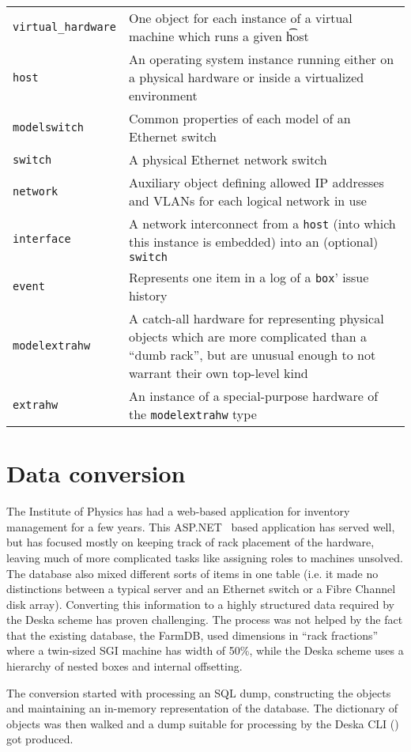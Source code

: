 \documentclass[deska]{subfiles}
\begin{document}
\begin{longtable}{ l | p{10cm}}
    {\tt virtual\_hardware} & One object for each instance of a virtual machine which runs a given {\t host} \\
    {\tt host} & An operating system instance running either on a physical hardware or inside a virtualized environment
    \\
    {\tt modelswitch} & Common properties of each model of an Ethernet switch \\
    {\tt switch } & A physical Ethernet network switch \\
    {\tt network} & Auxiliary object defining allowed IP addresses and VLANs for each logical network in use \\
    {\tt interface} & A network interconnect from a {\tt host} (into which this instance is embedded) into an (optional)
    {\tt switch} \\
    {\tt event} & Represents one item in a log of a {\tt box}' issue history \\
    {\tt modelextrahw} & A catch-all hardware for representing physical objects which are more complicated than a
    ``dumb rack'', but are unusual enough to not warrant their own top-level kind \\
    {\tt extrahw} & An instance of a special-purpose hardware of the {\tt modelextrahw} type
\end{longtable}

\section{Data conversion}
\label{sec:fzu-farmdb}

The Institute of Physics has had a web-based application for inventory management for a few years.  This
ASP.NET~\cite{asp.net} based application has served well, but has focused mostly on keeping track of rack placement of
the hardware, leaving much of more complicated tasks like assigning roles to machines unsolved.  The database also mixed
different sorts of items in one table (i.e. it made no distinctions between a typical server and an Ethernet switch or a
Fibre Channel disk array).  Converting this information to a highly structured data required by the Deska scheme has
proven challenging.  The process was not helped by the fact that the existing database, the FarmDB, used dimensions in
``rack fractions'' where a twin-sized SGI machine has width of 50\%, while the Deska scheme uses a hierarchy of nested
boxes and internal offsetting.

The conversion started with processing an SQL dump, constructing the objects and maintaining an in-memory representation
of the database.  The dictionary of objects was then walked and a dump suitable for processing by the Deska CLI
() got produced.
\end{document}
